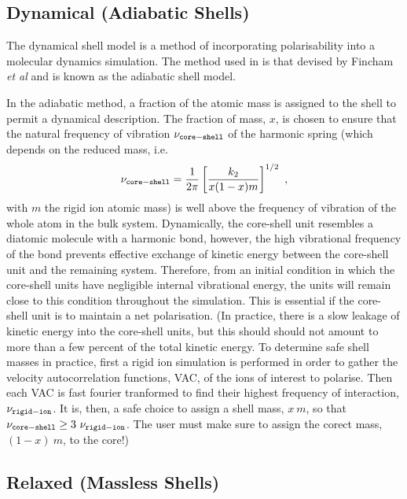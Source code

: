 \subsection{Dynamical (Adiabatic Shells)}
\label{shell-model}

The dynamical shell model is a method of incorporating
polarisability into a molecular dynamics simulation.
The method used in \D is that devised by Fincham {\em et al}
\cite{fincham-93a} and is known as the adiabatic shell model.

In the adiabatic method, a fraction of the atomic mass is assigned
to the shell to permit a dynamical description.  The fraction of
mass, $x$, is chosen to ensure that the natural frequency of
vibration $\nu_{\tt core-shell}$ of the harmonic spring (which
depends on the reduced mass, i.e.
\begin{equation}
\nu_{\tt core-shell} = \frac{1}{2\pi} \left[ \frac{k_{2}}{x(1-x)m} \right]^{1/2}~,
\end{equation}
with $m$ the rigid ion atomic mass) is well above the frequency of
vibration of the whole atom in the bulk system.  Dynamically,
the core-shell unit resembles a diatomic molecule with a harmonic
bond, however, the high vibrational
frequency of the bond prevents effective exchange of kinetic
energy between the core-shell unit and the remaining system.
Therefore, from an initial condition in which the core-shell units
have negligible internal vibrational energy, the units will remain
close to this condition throughout the simulation.  This is
essential if the core-shell unit is to maintain a net
polarisation.  (In practice, there is a slow
leakage of kinetic energy into the core-shell units, but this
should should not amount to more than a few percent of the total
kinetic energy.  To determine safe shell masses in practice,
first a rigid ion simulation is performed in order to gather the
velocity autocorrelation functions, VAC, of the ions of interest
to polarise.  Then each VAC is fast fourier tranformed to find
their highest frequency of interaction, $\nu_{\tt rigid-ion}$.  It
is, then, a safe choice to assign a shell mass, $x~m$, so that
$\nu_{\tt core-shell} \geq 3~\nu_{\tt rigid-ion}$.  The user must
make sure to assign the corect mass, $(1-x)~m$, to the core!)

\subsection{Relaxed (Massless Shells)}

